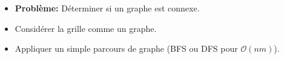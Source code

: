 \begin{frame}
    \frametitle{\problemtitle}
    \begin{itemize}
        \item<+-> \textbf{Problème:} Déterminer si un graphe est connexe.
        \item<+-> Considérer la grille comme un graphe.
        \item<+-> Appliquer un simple parcours de graphe (BFS ou DFS pour $\mathcal O(nm)$).
    \end{itemize}
\end{frame}
